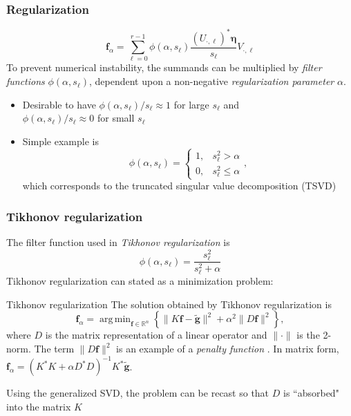 \documentclass[t]{beamer}
\newcommand{\noise}{\eta}	%
\newcommand{\gnoiseVec}{\widetilde{\mathbf{g}}}	%
\newcommand{\kMat}{K}	%
\newcommand{\fVec}{\mathbf{f}}	%
\newcommand{\ctrans}{*}	%
\newcommand{\noiseVec}{\mathbf{\noise}}	%
\newcommand{\singular}{s}	%
\newcommand{\regparam}{\alpha}
\newcommand{\regf}{\fVec_{\regparam}}	%
\DeclareMathOperator*{\argmin}{arg\,min}
\newcommand{\filt}{\phi}
\begin{document}
\begin{frame}
\frametitle{Regularization}
\[\fVec_\regparam = \sum_{\ell=0}^{r-1} \filt(\regparam,\singular_\ell)\frac{(U_{\cdot,\ell})^\ctrans{\noiseVec}}{\singular_{\ell}}V_{\cdot,\ell}\]
To prevent numerical instability, the summands can be multiplied by \textit{filter functions} $\filt(\regparam,\singular_{\ell})$, dependent upon a non-negative \textit{regularization parameter} $\regparam$.
\begin{itemize}
\item Desirable to have $\filt(\regparam,\singular_\ell)/\singular_\ell \approx 1$ for large $\singular_\ell$ and \\ 
$\filt(\regparam,\singular_\ell)/\singular_\ell \approx 0$ for small $\singular_\ell$
\item Simple example is 
\[\filt(\regparam,\singular_\ell) = \begin{cases}
1, & \singular^2_\ell > \regparam \\
0, & \singular^2_\ell \leq \regparam
\end{cases},\]
which corresponds to the truncated singular value decomposition (TSVD) \cite[p.~3-5]{Vogel:2002}
\end{itemize}
\end{frame}

\begin{frame}
\frametitle{Tikhonov regularization}
The filter function used in \textit{Tikhonov regularization} \cite{Tikh1963} is
\[\filt(\regparam,\singular_\ell) = \frac{\singular^2_\ell}{\singular^2_\ell + \regparam}\]
Tikhonov regularization can stated as a minimization problem:
\begin{block}{Tikhonov regularization}
The solution obtained by Tikhonov regularization is
\[\fVec_\regparam = \argmin_{\fVec\in\mathbb{R}^n} \left\{\|\kMat\fVec - \gnoiseVec\|^2 + \regparam^2\|D\fVec\|^2\right\},\]
where $D$ is the matrix representation of a linear operator and $\|\cdot\|$ is the 2-norm. The term $\|D\fVec\|^2$ is an example of a \textit{penalty function} \cite{Vogel:2002}. In matrix form, $\regf = (\kMat^\ctrans{\kMat} + \regparam{D^\ctrans}D)^{-1}\kMat^\ctrans\gnoiseVec$.
\end{block}
Using the generalized SVD, the problem can be recast so that $D$ is ``absorbed" into the matrix $\kMat$ \cite{ABT, Hansen:98}
\end{frame}
\end{document}
